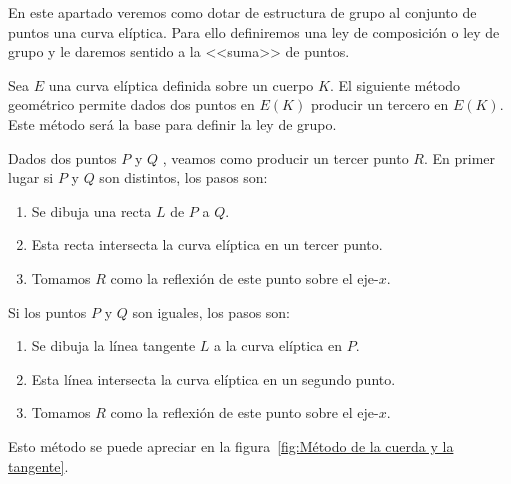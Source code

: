 En este apartado veremos como dotar de estructura de grupo al conjunto de puntos una curva elíptica. Para ello definiremos una ley de composición o ley de grupo y le daremos sentido a la <<suma>> de puntos.

Sea $E$ una curva elíptica definida sobre un cuerpo $K$. El siguiente método geométrico permite dados dos puntos en $E(K)$ producir un tercero en $E(K)$. Este método será la base para definir la ley de grupo.

\begin{algoritmo}
	Dados dos puntos $P$ y $Q$ , veamos como producir un tercer punto $R$. En primer lugar si $P$ y $Q$ son distintos, los pasos son:
	\begin{enumerate}
		\item Se dibuja una recta $L$ de $P$ a $Q$.
		\item Esta recta intersecta la curva elíptica en un tercer punto.
		\item Tomamos $R$ como la reflexión de este punto sobre el eje-$x$.
	\end{enumerate}
	Si los puntos $P$ y $Q$ son iguales, los pasos son:
	\begin{enumerate}
		\item Se dibuja la línea tangente $L$ a la curva elíptica en $P$.
		\item Esta línea intersecta la curva elíptica en un segundo punto.
		\item Tomamos $R$ como la reflexión de este punto sobre el eje-$x$.
	\end{enumerate}
	Esto método se puede apreciar en la figura~\ref{fig:Método de la cuerda y la tangente}.
\end{algoritmo}

